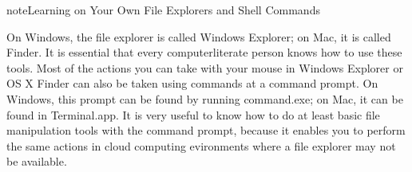 \documentclass[letterpaper,10pt,english]{jupyterBook}
\begin{document}
\begin{sphinxadmonition}{note}{Learning on Your Own \sphinxhyphen{} File Explorers and Shell Commands}

\sphinxAtStartPar
On Windows, the file explorer is called Windows Explorer; on Mac, it is called Finder.  It is essential that every computer\sphinxhyphen{}literate person knows how to use these tools.  Most of the actions you can take with your mouse in Windows Explorer or OS X Finder can also be taken using commands at a command prompt.  On Windows, this prompt can be found by running command.exe; on Mac, it can be found in Terminal.app.  It is very useful to know how to do at least basic file manipulation tools with the command prompt, because it enables you to perform the same actions in cloud computing evironments where a file explorer may not be available.
\end{sphinxadmonition}
\end{document}
